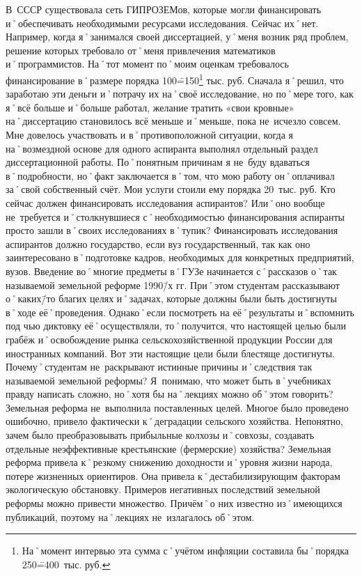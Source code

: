 \begin{drama}
	В~СССР существовала сеть ГИПРОЗЕМов, которые могли финансировать и˚обеспечивать необходимыми ресурсами исследования. Сейчас их˚нет. Например, когда я˚занимался своей диссертацией, у˚меня возник ряд проблем, решение которых требовало от˚меня привлечения математиков и˚программистов. На˚тот момент по˚моим оценкам требовалось финансирование в˚размере порядка 100\==150\footnote{На˚момент интервью эта сумма с˚учётом инфляции составила бы˚порядка 250\==400~тыс. руб.} тыс. руб. Сначала я˚решил, что заработаю эти деньги и˚потрачу их на˚своё исследование, но по˚мере того, как я˚всё больше и˚больше работал, желание тратить  «свои кровные» на˚диссертацию становилось всё меньше и˚меньше, пока не~исчезло совсем. Мне довелось участвовать и в˚противоположной ситуации, когда я на˚возмездной основе для одного аспиранта выполнял отдельный раздел диссертационной работы. По˚понятным причинам я не~буду вдаваться в˚подробности, но˚факт заключается в˚том, что мою работу он˚оплачивал за˚свой собственный счёт. Мои услуги стоили ему порядка 20~тыс. руб. 
	Кто сейчас должен финансировать исследования аспирантов? Или˚оно вообще не~требуется и˚столкнувшиеся с˚необходимостью финансирования аспиранты просто зашли в˚своих исследованиях в˚тупик?
	\michaelspeaks Финансировать исследования аспирантов должно государство, если вуз государственный, так как оно заинтересовано в˚подготовке кадров, необходимых для конкретных предприятий, вузов.
	\maxspeaks Введение во˚многие предметы в˚ГУЗе начинается с˚рассказов о˚так называемой земельной реформе 1990\=/х гг. При˚этом студентам рассказывают о˚каких\=/то благих целях и˚задачах, которые должны были быть достигнуты в˚ходе её˚проведения. Однако˚если посмотреть на её˚результаты и˚вспомнить под чью диктовку её˚осуществляли, то˚получится, что настоящей целью были грабёж и˚освобождение рынка сельскохозяйственной продукции России для иностранных компаний. Вот эти настоящие цели были блестяще достигнуты. 
Почему˚студентам не~раскрывают истинные причины и˚следствия так называемой земельной реформы? Я~понимаю, что может быть в˚учебниках правду написать сложно, но˚хотя бы на˚лекциях можно об˚этом говорить?
	\michaelspeaks Земельная реформа не~выполнила поставленных целей. Многое было проведено ошибочно, привело фактически к˚деградации сельского хозяйства. Непонятно, зачем было преобразовывать прибыльные колхозы и˚совхозы, создавать отдельные неэффективные крестьянские (фермерские) хозяйства?
	Земельная реформа привела к˚резкому снижению доходности и˚уровня жизни народа, потере жизненных ориентиров. Она привела к˚дестабилизирующим факторам экологическую обстановку. Примеров негативных последствий земельной реформы можно привести множество. Причём˚о них известно из˚имеющихся публикаций, поэтому на˚лекциях не~излагалось об˚этом.

\end{drama}
